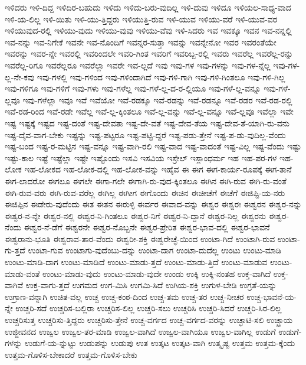 {ಇಳಿದರು
ಇಳಿ-ದಿದ್ದ
ಇಳಿದಿರ-ಬಹುದು
ಇಳಿದು
ಇಳಿದು-ಬರು-ವುದಿಲ್ಲ
ಇಳಿ-ದುವು
ಇಳಿದೂ
ಇಳಿಯಲ-ಸಾಧ್ಯ-ವಾದ
ಇಳಿ-ಯ-ಲಿಲ್ಲ
ಇಳಿ-ಯಿತು
ಇಳಿ-ಯು-ತ್ತಿದ್ದರು
ಇಳಿಯುತ್ತಿ-ರುವ
ಇಳಿ-ಯುವ
ಇಳಿಯು-ವರೆ
ಇಳಿ-ಯುವ-ವರ
ಇಳಿಯುವುದ-ರಲ್ಲಿ
ಇಳಿಯು-ವುದು
ಇಳಿಯು-ವುವು
ಇಳಿಯು-ವೆವು
ಇಳಿ-ಸಿದರು
ಇವ
ಇವಕ್ಕೂ
ಇವನ
ಇವ-ನನ್ನಲ್ಲಿ
ಇವ-ನನ್ನು
ಇವ-ನಿಗೇಕೆ
ಇವನೇ
ಇವ-ನೊಂದಿಗೆ
ಇವನ್ನರ-ಸುತ್ತಾ
ಇವನ್ನು
ಇವನ್ನೇನೋ
ಇವರ
ಇವರಂತೆಯೇ
ಇವರನ್ನು
ಇವರ-ನ್ನೇ
ಇವರಲ್ಲಿ
ಇವರಿಂದಲೇ
ಇವರಿ-ಗಿಂತ
ಇವರಿಗೆ
ಇವರಿಬ್ಬ-ರಲ್ಲಿ
ಇವರು
ಇವರೆಲ್ಲ
ಇವರೆಲ್ಲ-ರನ್ನು
ಇವರೆಲ್ಲ-ರಿಗೂ
ಇವರೆಲ್ಲರೂ
ಇವರೆಲ್ಲಾ
ಇವರೇ
ಇವ-ಲ್ಲದೆ
ಇವು
ಇವು-ಗಳ
ಇವು-ಗಳನ್ನು
ಇವು-ಗಳ-ನ್ನೆಲ್ಲ
ಇವು-ಗಳ-ಲ್ಲ-ನೇ-ಕವು
ಇವು-ಗಳಲ್ಲಿ
ಇವು-ಗಳಿಂದ
ಇವು-ಗಳಿಂದಾಗಿದೆ
ಇವು-ಗಳಿ-ಗಾಗಿ
ಇವು-ಗಳಿ-ಗಿಂತಲೂ
ಇವು-ಗಳಿ-ಗಿಲ್ಲ
ಇವು-ಗಳಿಗೂ
ಇವು-ಗಳಿಗೆ
ಇವು-ಗಳು
ಇವು-ಗಳೆಲ್ಲ
ಇವು-ಗಳೆ-ಲ್ಲ-ದ-ರ-ಲ್ಲಿಯೂ
ಇವು-ಗಳೆ-ಲ್ಲ-ವನ್ನೂ
ಇವು-ಗಳೆ-ಲ್ಲವೂ
ಇವು-ಗಳೆಲ್ಲಾ
ಇವೂ
ಇವೆ
ಇವೆಯೋ
ಇವೆ-ರಡಕ್ಕೂ
ಇವೆ-ರಡನ್ನು
ಇವೆ-ರಡನ್ನೂ
ಇವೆ-ರಡರ
ಇವೆ-ರಡ-ರಲ್ಲಿ
ಇವೆ-ರಡ-ರಿಂದ
ಇವೆ-ರಡೇ
ಇವೆಲ್ಲ
ಇವೆ-ಲ್ಲ-ಕ್ಕಿಂತಲೂ
ಇವೆ-ಲ್ಲ-ವನ್ನು
ಇವೆ-ಲ್ಲ-ವನ್ನೂ
ಇವೆ-ಲ್ಲವೂ
ಇವೆಲ್ಲಾ
ಇವೇ
ಇಷ್ಟ
ಇಷ್ಟಕ್ಕೆ
ಇಷ್ಟದ
ಇಷ್ಟ-ದಂತೆ
ಇಷ್ಟ-ದೇವತಾ
ಇಷ್ಟ-ದೇ-ವತೆ
ಇಷ್ಟ-ದೇವ-ತೆಯ
ಇಷ್ಟ-ದೇವ-ತೆ-ಯಾಗಿ-ರು-ವನು
ಇಷ್ಟ-ದೈವ-ವಾಗ-ಬೇಕು
ಇಷ್ಟನ್ನು
ಇಷ್ಟ-ಪಟ್ಟರೂ
ಇಷ್ಟ-ಪಟ್ಟಿ-ದ್ದರೆ
ಇಷ್ಟ-ಪಡು-ತ್ತೇನೆ
ಇಷ್ಟ-ಪ-ಡು-ವುದಿಲ್ಲ-ವೆಂದು
ಇಷ್ಟ-ಬಂದ
ಇಷ್ಟ-ರ-ಮಟ್ಟಿನ
ಇಷ್ಟ-ವನ್ನೂ
ಇಷ್ಟ-ವಾಗಿ-ರಲಿ
ಇಷ್ಟ-ವಾದ
ಇಷ್ಟ-ವಾದಂತೆ
ಇಷ್ಟ-ವಿಲ್ಲ
ಇಷ್ಟ-ವೆಂದು
ಇಷ್ಟು
ಇಷ್ಟು-ಕಾಲ
ಇಷ್ಟೆ
ಇಷ್ಟೆಲ್ಲಾ
ಇಷ್ಟೇ
ಇಷ್ಟೊಂದು
ಇಸವಿ
ಇಸವಿಯ
ಇಸ್ರೇಲ್
ಇಸ್ಲಾಂಧರ್ಮ
ಇಹ
ಇಹ-ಪರ-ಗಳ
ಇಹ-ಲೋಕ
ಇಹ-ಲೋಕದ
ಇಹ-ಲೋಕ-ದಲ್ಲಿ
ಇಹ-ಲೋಕ-ವನ್ನು
ಇಹೈವ
ಈ
ಈಗ
ಈಗ-ಕಾರ್ಯ-ರೂಪಕ್ಕೆ
ಈಗ-ತಾನೆ
ಈಗ-ಲಾದರೋ
ಈಗಲೂ
ಈಗಲೇ
ಈಗಾ-ಗಲೇ
ಈಗಾಗಿ-ರು-ವುದ-ಕ್ಕಿಂತಲೂ
ಈಗಿನ
ಈಗಿ-ರುವ
ಈಗಿ-ರು-ವಂತೆ
ಈಗಿ-ರುವ-ವರು
ಈಗಿ-ರುವ-ವರೆಲ್ಲ
ಈಗಿಲ್ಲ
ಈಗೀಗ
ಈಗೊಂದು
ಈಚಿನ
ಈಚೀಚೆಗೆ
ಈಚೆಗೆ
ಈಜಿಪ್ಟಿ-ಯ-ನರು
ಈಜಿಪ್ಪಿನ
ಈಡೇರು-ವುದೆಂದು
ಈತ
ಈತನ
ಈರುಳ್ಳಿ
ಈರ್ವರ
ಈವಾದ-ವನ್ನು
ಈಶ್ವರ
ಈಶ್ವರಃ
ಈಶ್ವರನ
ಈಶ್ವರ-ನನ್ನು
ಈಶ್ವರ-ನ-ನ್ನೇ
ಈಶ್ವರ-ನಲ್ಲಿ
ಈಶ್ವರ-ನಿ-ಗಿಂತಲೂ
ಈಶ್ವರ-ನಿಗೆ
ಈಶ್ವರ-ನಿ-ದ್ದಾನೆ
ಈಶ್ವರ-ನಿಲ್ಲ
ಈಶ್ವರನು
ಈಶ್ವರ-ನೆಂದು
ಈಶ್ವರ-ನೆ-ಡೆಗೆ
ಈಶ್ವರನೇ
ಈಶ್ವರ-ನೊಬ್ಬನೇ
ಈಶ್ವರ-ಪ್ರೇರಿತ
ಈಶ್ವರ-ಭಾವ-ದಲ್ಲಿ
ಈಶ್ವರ-ಭಾವನೆ
ಈಶ್ವರಾನು-ಭೂತಿ
ಈಶ್ವರಾವ-ತಾರ-ವೆಂದು
ಈಶ್ವರೀ-ಶಕ್ತಿ
ಈಶ್ವರೇಚ್ಛೆ-ಯಿಂದ
ಉಂಟಾ-ಗಿದೆ
ಉಂಟಾಗಿ-ರುವ
ಉಂಟಾ-ಗು-ತ್ತದೆ
ಉಂಟಾ-ಗುವ
ಉಂಟಾಗು-ವುದೆಂಬು-ದನ್ನು
ಉಂಟಾ-ದಾಗ
ಉಂಟಾ-ದುದೆಲ್ಲ
ಉಂಟು
ಉಂಟು-ಮಾಡಿ
ಉಂಟು-ಮಾಡಿ-ದಾಗ
ಉಂಟು-ಮಾಡಿದೆ
ಉಂಟು-ಮಾಡು-ತ್ತದೆ
ಉಂಟು-ಮಾಡು-ತ್ತಿದೆ
ಉಂಟು-ಮಾಡುವ
ಉಂಟು-ಮಾಡು-ವಂತೆ
ಉಂಟು-ಮಾಡು-ವುದು
ಉಂಟು-ಮಾಡು-ವುದೇ
ಉಂಡು
ಉಕ್ಕಿ
ಉಕ್ಕಿ-ನಂತಹ
ಉಕ್ತ-ವಾಗಿದೆ
ಉಕ್ತ-ವಾಗಿವೆ
ಉಕ್ತ-ವಾಗು-ತ್ತದೆ
ಉಗಮದ
ಉಗ-ಮಿಸಿ
ಉಗಮಿ-ಸಿದೆ
ಉಗಿಯ-ಶಕ್ತಿ
ಉಗುಳ-ಬೇಡಿ
ಉಗ್ರತೆ-ಯನ್ನು
ಉಗ್ರಾಣ-ವನ್ನಾಗಿ
ಉಚಿತ-ವಲ್ಲ
ಉಚ್ಚ
ಉಚ್ಚ-ಕಂಠ-ದಿಂದ
ಉಚ್ಚ-ತಮ
ಉಚ್ಚ-ತರ
ಉಚ್ಚ-ನೀಚರ
ಉಚ್ಚ-ಭಾವನೆ-ಯ-ನ್ನೇ
ಉಚ್ಚರಿ-ಸದೆ
ಉಚ್ಚರಿಸ-ಬಲ್ಲಿರಾ
ಉಚ್ಚರಿಸ-ಲಿಲ್ಲ
ಉಚ್ಚರಿ-ಸಲು
ಉಚ್ಚರಿಸಿ
ಉಚ್ಚರಿ-ಸಿದರೆ
ಉಚ್ಚರಿ-ಸಿರ-ಲಿಲ್ಲ
ಉಚ್ಚರಿಸುತ್ತ
ಉಚ್ಚರಿಸು-ತ್ತಿದ್ದರು
ಉಚ್ಚರಿಸು-ತ್ತೇನೆ
ಉಚ್ಚ-ವರ್ಗದ
ಉಚ್ಚ-ವರ್ಗದ-ವರನ್ನು
ಉಚ್ಛಾಟಿ-ಸಲಿ
ಉಚ್ಛ್ರಾಯ
ಉಜ್ಜೀವನದ
ಉಜ್ವಲ
ಉಜ್ವಲ-ತರ-ಮಾಡಿ
ಉಜ್ವಲ-ವಾಗಿದೆ
ಉಜ್ವಲ-ವಾಗಿಯೂ
ಉಜ್ವಲ-ವಾಗಿಲ್ಲ
ಉಡುಗೆ
ಉಡುಗೆ-ಗಳನ್ನು
ಉಡುಗೆ-ಯ-ನ್ನುಟ್ಟು
ಉಡುಪನ್ನು
ಉಡುಪು
ಉತ
ಉತ್ಕಟ
ಉತ್ಕಟ-ವಾಗಿ
ಉತ್ಕೃಷ್ಟ
ಉತ್ತಮ
ಉತ್ತಮ-ಕ್ಕೆಂದು
ಉತ್ತಮ-ಗೊಳಿಸ-ಬೇಕಾದರೆ
ಉತ್ತಮ-ಗೊಳಿಸ-ಬೇಕು
}
